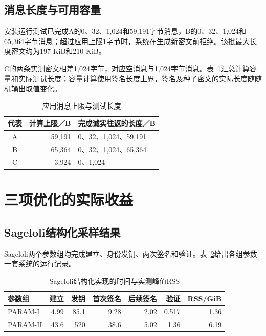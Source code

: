 \subsection{消息长度与可用容量}
安装运行测试已完成A的0、32、1,024和59,191字节消息，B的0、32、1,024和65,364字节消息；超过应用上限1字节时，系统在生成新密文前拒绝。该批最大长度密文约为197 KiB和210 KiB。

C的两条实测密文相差1,024字节，对应空消息与1,024字节消息。表~\ref{tab:message-coverage}汇总计算容量和实际测试长度；容量计算使用签名长度上界，签名及种子密文的实际长度随随机输出取值变化。

\begin{table}[H]
\centering\small
\caption{应用消息上限与测试长度}
\label{tab:message-coverage}
\begin{tabular}{@{}crl@{}}
\toprule
\rowcolor{black!8} 代表 & 计算上限／B & 完成诚实往返的长度／B \\
\midrule
A & 59,191 & 0、32、1,024、59,191 \\
B & 65,364 & 0、32、1,024、65,364 \\
C & 3,924 & 0、1,024 \\
\bottomrule
\end{tabular}
\end{table}

\section{三项优化的实际收益}
\subsection{Sageloli结构化采样结果}
Sageloli两个参数组均完成建立、身份发钥、两次签名和验证。表~\ref{tab:sageloli-times}给出各组参数一套系统的运行记录。

\begin{table}[H]
\centering\small
\caption{Sageloli结构化实现的时间与实测峰值RSS}
\label{tab:sageloli-times}
\begin{tabular}{@{}lrrrrrr@{}}
\toprule
\rowcolor{black!8} 参数组 & 建立 & 发钥 & 首次签名 & 后续签名 & 验证 & RSS/GiB \\
\midrule
PARAM-I & 4.99 & 85.1 & 9.28 & 2.02 & 0.517 & 1.36 \\
PARAM-II & 43.6 & 520 & 38.6 & 5.02 & 1.36 & 6.19 \\
\bottomrule
\end{tabular}
\end{table}

